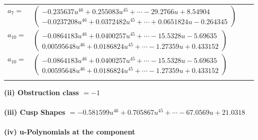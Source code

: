 \documentclass[1p]{elsarticle_modified}
\theoremstyle{definition}
\begin{document}
\begin{tabular}{m{7pt} m{180pt} m{7pt} m{180pt} }
\flushright $a_{7}=$&$\begin{pmatrix}-0.235637 u^{46}+0.255083 u^{45}+\cdots-29.2766 u+8.54904\\-0.0237208 u^{46}+0.0372482 u^{45}+\cdots+0.0651824 u-0.264345\end{pmatrix}$ \\
\flushright $a_{10}=$&$\begin{pmatrix}-0.0864183 u^{46}+0.0400257 u^{45}+\cdots-15.5328 u-5.69635\\0.00595648 u^{46}+0.0186824 u^{45}+\cdots-1.27359 u+0.433152\end{pmatrix}$\\ \flushright $a_{10}=$&$\begin{pmatrix}-0.0864183 u^{46}+0.0400257 u^{45}+\cdots-15.5328 u-5.69635\\0.00595648 u^{46}+0.0186824 u^{45}+\cdots-1.27359 u+0.433152\end{pmatrix}$\\&\end{tabular}
\flushleft \textbf{(ii) Obstruction class $= -1$}\\~\\
\flushleft \textbf{(iii) Cusp Shapes $= -0.581599 u^{46}+0.705867 u^{45}+\cdots-67.0569 u+21.0318$}\\~\\
\newpage\renewcommand{\arraystretch}{1}
\flushleft \textbf{(iv) u-Polynomials at the component}\newline \\
\end{document}
